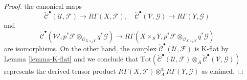 \documentclass{stacks-project}
\theoremstyle{plain}
\theoremstyle{definition}
\theoremstyle{remark}
\numberwithin{equation}{subsection}
\begin{document}
\begin{proof}
the canonical maps
$$
\check{\mathcal{C}}^\bullet(\mathcal{U}, \mathcal{F})
\to
R\Gamma(X, \mathcal{F}),
\quad
\check{\mathcal{C}}^\bullet(\mathcal{V}, \mathcal{G})
\to
R\Gamma(Y, \mathcal{G})
$$
and
$$
\check{\mathcal{C}}^\bullet(\mathcal{W},
p^*\mathcal{F} \otimes_{\mathcal{O}_{X \times_S Y}} q^*\mathcal{G})
\to
R\Gamma(X \times_S Y,
p^*\mathcal{F} \otimes_{\mathcal{O}_{X \times_S Y}}
q^*\mathcal{G})
$$
are isomorphisms. On the other hand, the complex
$\check{\mathcal{C}}^\bullet(\mathcal{U}, \mathcal{F})$
is K-flat by Lemma \ref{lemma-K-flat} and we conclude that
$\text{Tot}(
\check{\mathcal{C}}^\bullet(\mathcal{U}, \mathcal{F})
\otimes_A
\check{\mathcal{C}}^\bullet(\mathcal{V}, \mathcal{G}))$
represents the derived tensor product
$R\Gamma(X, \mathcal{F}) \otimes_A^\mathbf{L} R\Gamma(Y, \mathcal{G})$
as claimed.


\end{proof}
\end{document}
